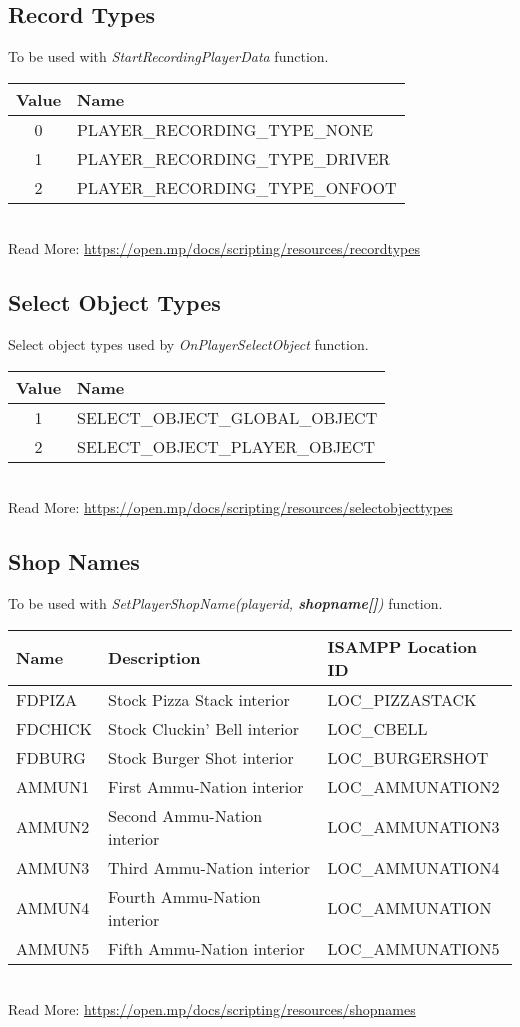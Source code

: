 \documentclass{article}
\begin{document}
\subsection{Record Types}
To be used with \textit{StartRecordingPlayerData} function.
\bigskip
\\\begin{tabular}{ |c|l| }
\hline
Value & Name \\
\hline
0 & PLAYER\_RECORDING\_TYPE\_NONE \\
1 & PLAYER\_RECORDING\_TYPE\_DRIVER \\
2 & PLAYER\_RECORDING\_TYPE\_ONFOOT \\
\hline
\end{tabular}
\bigskip
\\Read More: \url{https://open.mp/docs/scripting/resources/recordtypes}

\subsection{Select Object Types}
Select object types used by \textit{OnPlayerSelectObject} function.
\bigskip
\\\begin{tabular}{ |c|l| }
\hline
Value & Name \\
\hline
1 & SELECT\_OBJECT\_GLOBAL\_OBJECT \\
2 & SELECT\_OBJECT\_PLAYER\_OBJECT \\
\hline
\end{tabular}
\bigskip
\\Read More: \url{https://open.mp/docs/scripting/resources/selectobjecttypes}


\newpage
\subsection{Shop Names}
To be used with \textit{SetPlayerShopName(playerid, \textbf{shopname[]})} function.
\bigskip
\\\begin{tabular}{ |l|l|l| }
\hline
Name & Description & ISAMPP Location ID \\
\hline
FDPIZA & Stock Pizza Stack interior & LOC\_PIZZASTACK \\
FDCHICK & Stock Cluckin' Bell interior & LOC\_CBELL \\
FDBURG & Stock Burger Shot interior & LOC\_BURGERSHOT \\
AMMUN1 & First Ammu-Nation interior & LOC\_AMMUNATION2 \\
AMMUN2 & Second Ammu-Nation interior & LOC\_AMMUNATION3 \\
AMMUN3 & Third Ammu-Nation interior & LOC\_AMMUNATION4 \\
AMMUN4 & Fourth Ammu-Nation interior & LOC\_AMMUNATION \\
AMMUN5 & Fifth Ammu-Nation interior & LOC\_AMMUNATION5 \\
\hline
\end{tabular}
\bigskip
\\Read More: \url{https://open.mp/docs/scripting/resources/shopnames}
\end{document}
